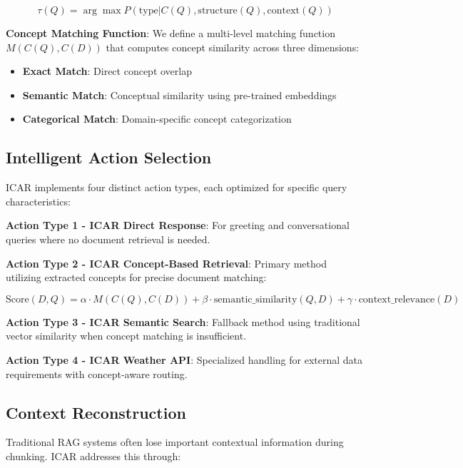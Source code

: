 \documentclass[11pt]{article}
\begin{document}
\begin{equation}
\tau(Q) = \arg\max P(\text{type}|C(Q), \text{structure}(Q), \text{context}(Q))
\end{equation}

\textbf{Concept Matching Function}: We define a multi-level matching function $M(C(Q), C(D))$ that computes concept similarity across three dimensions:

\begin{itemize}
\item \textbf{Exact Match}: Direct concept overlap
\item \textbf{Semantic Match}: Conceptual similarity using pre-trained embeddings
\item \textbf{Categorical Match}: Domain-specific concept categorization
\end{itemize}

\subsection{Intelligent Action Selection}

ICAR implements four distinct action types, each optimized for specific query characteristics:

\textbf{Action Type 1 - ICAR Direct Response}: For greeting and conversational queries where no document retrieval is needed.

\textbf{Action Type 2 - ICAR Concept-Based Retrieval}: Primary method utilizing extracted concepts for precise document matching:

\begin{equation}
\text{Score}(D,Q) = \alpha \cdot M(C(Q), C(D)) + \beta \cdot \text{semantic\_similarity}(Q,D) + \gamma \cdot \text{context\_relevance}(D)
\end{equation}

\textbf{Action Type 3 - ICAR Semantic Search}: Fallback method using traditional vector similarity when concept matching is insufficient.

\textbf{Action Type 4 - ICAR Weather API}: Specialized handling for external data requirements with concept-aware routing.

\subsection{Context Reconstruction}

Traditional RAG systems often lose important contextual information during chunking. ICAR addresses this through:
\end{document}
